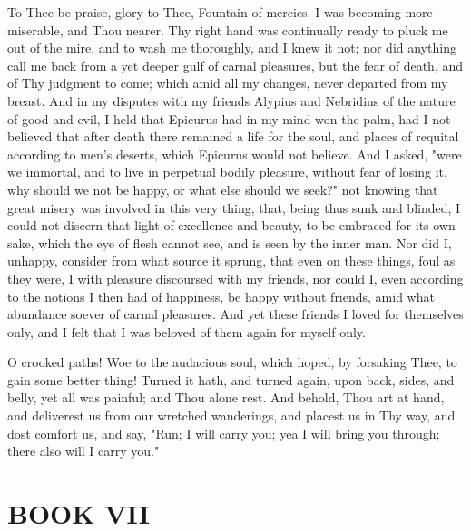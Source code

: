 \documentclass[b5paper,openright,12pt,twoside]{book}
\begin{document}
To Thee be praise, glory to Thee, Fountain of mercies. I was becoming
more miserable, and Thou nearer. Thy right hand was continually ready to
pluck me out of the mire, and to wash me thoroughly, and I knew it
not; nor did anything call me back from a yet deeper gulf of carnal
pleasures, but the fear of death, and of Thy judgment to come; which
amid all my changes, never departed from my breast. And in my disputes
with my friends Alypius and Nebridius of the nature of good and evil, I
held that Epicurus had in my mind won the palm, had I not believed that
after death there remained a life for the soul, and places of requital
according to men's deserts, which Epicurus would not believe. And I
asked, "were we immortal, and to live in perpetual bodily pleasure,
without fear of losing it, why should we not be happy, or what else
should we seek?" not knowing that great misery was involved in this very
thing, that, being thus sunk and blinded, I could not discern that light
of excellence and beauty, to be embraced for its own sake, which the eye
of flesh cannot see, and is seen by the inner man. Nor did I, unhappy,
consider from what source it sprung, that even on these things, foul as
they were, I with pleasure discoursed with my friends, nor could I,
even according to the notions I then had of happiness, be happy without
friends, amid what abundance soever of carnal pleasures. And yet these
friends I loved for themselves only, and I felt that I was beloved of
them again for myself only.

O crooked paths! Woe to the audacious soul, which hoped, by forsaking
Thee, to gain some better thing! Turned it hath, and turned again, upon
back, sides, and belly, yet all was painful; and Thou alone rest.
And behold, Thou art at hand, and deliverest us from our wretched
wanderings, and placest us in Thy way, and dost comfort us, and say,
"Run; I will carry you; yea I will bring you through; there also will I
carry you."




\chapter{BOOK VII}
\end{document}

